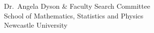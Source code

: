 \documentclass[12pt, a4paper]{letter}
\begin{document}
\begin{letter}{
        Dr.~Angela Dyson \& Faculty Search Committee \\
        School of Mathematics, Statistics and Physics \\
        Newcastle University}

\end{letter}
\end{document}
